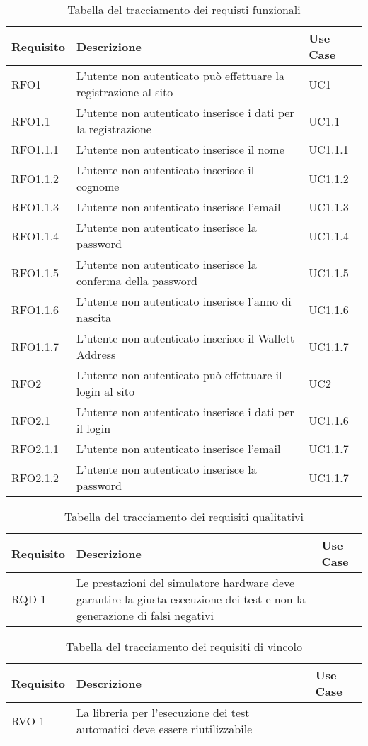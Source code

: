 \begin{table}[H]
\caption{Tabella del tracciamento dei requisti funzionali}
\label{tab:requisiti-funzionali}
\begin{tabularx}{\textwidth}{lXl}
\hline\hline
\textbf{Requisito} & \textbf{Descrizione} & \textbf{Use Case}\\
\hline
RFO1 & L'utente non autenticato può effettuare la registrazione al sito & UC1 \\
\hline
RFO1.1 & L'utente non autenticato inserisce i dati per la registrazione & UC1.1 \\
\hline
RFO1.1.1 & L'utente non autenticato inserisce il nome & UC1.1.1 \\
\hline
RFO1.1.2 & L'utente non autenticato inserisce il cognome & UC1.1.2 \\
\hline
RFO1.1.3 & L'utente non autenticato inserisce l'email & UC1.1.3 \\
\hline
RFO1.1.4 & L'utente non autenticato inserisce la password & UC1.1.4 \\
\hline
RFO1.1.5 & L'utente non autenticato inserisce la conferma della password & UC1.1.5 \\
\hline
RFO1.1.6 & L'utente non autenticato inserisce l'anno di nascita & UC1.1.6 \\
\hline
RFO1.1.7 & L'utente non autenticato inserisce il Wallett Address & UC1.1.7 \\
\hline
RFO2 & L'utente non autenticato può effettuare il login al sito & UC2 \\
\hline
RFO2.1 &L'utente non autenticato inserisce i dati per il login & UC1.1.6 \\
\hline
RFO2.1.1 & L'utente non autenticato inserisce l'email & UC1.1.7 \\
\hline
RFO2.1.2 & L'utente non autenticato inserisce  la password & UC1.1.7 \\
\hline
\end{tabularx}
\end{table}%

\begin{table}[H]
\caption{Tabella del tracciamento dei requisiti qualitativi}
\label{tab:requisiti-qualitativi}
\begin{tabularx}{\textwidth}{lXl}
\hline\hline
\textbf{Requisito} & \textbf{Descrizione} & \textbf{Use Case}\\
\hline
RQD-1    & Le prestazioni del simulatore hardware deve garantire la giusta esecuzione dei test e non la generazione di falsi negativi & - \\
\hline
\end{tabularx}
\end{table}%

\begin{table}[H]
\caption{Tabella del tracciamento dei requisiti di vincolo}
\label{tab:requisiti-vincolo}
\begin{tabularx}{\textwidth}{lXl}
\hline\hline
\textbf{Requisito} & \textbf{Descrizione} & \textbf{Use Case}\\
\hline
RVO-1    & La libreria per l'esecuzione dei test automatici deve essere riutilizzabile & - \\
\hline
\end{tabularx}
\end{table}%